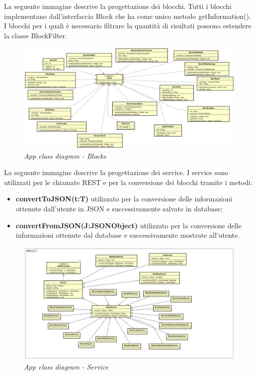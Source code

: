 \newpage
La seguente immagine descrive la progettazione dei blocchi.
Tutti i blocchi implementano dall'interfaccia Block che ha come unico metodo getInformation().
I blocchi per i quali è necessario filtrare la quantità di risultati possono estendere la classe BlockFilter.
\begin{figure} [H]
	\centering
	\includegraphics[scale=0.3]{./images/Blocks.png}
	\caption{\textit{App class diagram - Blocks}}\label{Blocks}
\end{figure}
\newpage
La seguente immagine descrive la progettazione dei service.
I service sono utilizzati per le chiamate REST e per la conversione dei blocchi tramite i metodi:
\begin{itemize}
	\item \textbf{convertToJSON(t:T)} utilizzato per la conversione delle informazioni ottenute dall'utente in JSON e successivamente salvate in database;
	\item \textbf{convertFromJSON(J:JSONObject)} utilizzato per la conversione delle informazioni ottenute dal database e successivamente mostrate all'utente. 
\end{itemize}
\begin{figure} [H]
	\centering
	\includegraphics[scale=0.3]{./images/Service.png}
	\caption{\textit{App class diagram - Service}}\label{Service}
\end{figure}
